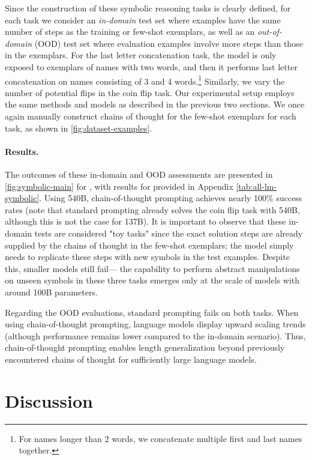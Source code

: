 Since the construction of these symbolic reasoning tasks is clearly defined, for each task we consider an \textit{in-domain} test set where examples have the same number of steps as the training or few-shot exemplars, as well as an \textit{out-of-domain} (OOD) test set where evaluation examples involve more steps than those in the exemplars. For the last letter concatenation task, the model is only exposed to exemplars of names with two words, and then it performs last letter concatenation on names consisting of 3 and 4 words.\footnote{For names longer than 2 words, we concatenate multiple first and last names together.} Similarly, we vary the number of potential flips in the coin flip task. Our experimental setup employs the same methods and models as described in the previous two sections. We once again manually construct chains of thought for the few-shot exemplars for each task, as shown in \cref{fig:dataset-examples}.

\paragraph{Results.}
The outcomes of these in-domain and OOD assessments are presented in \cref{fig:symbolic-main} for \palm{}, with results for \lamda{} provided in Appendix \cref{tab:all-lm-symbolic}. Using \palm{} 540B, chain-of-thought prompting achieves nearly 100\% success rates (note that standard prompting already solves the coin flip task with \palm{} 540B, although this is not the case for \lamda{} 137B). It is important to observe that these in-domain tests are considered "toy tasks" since the exact solution steps are already supplied by the chains of thought in the few-shot exemplars; the model simply needs to replicate these steps with new symbols in the test examples. Despite this, smaller models still fail— the capability to perform abstract manipulations on unseen symbols in these three tasks emerges only at the scale of models with around 100B parameters.

Regarding the OOD evaluations, standard prompting fails on both tasks. When using chain-of-thought prompting, language models display upward scaling trends (although performance remains lower compared to the in-domain scenario). Thus, chain-of-thought prompting enables length generalization beyond previously encountered chains of thought for sufficiently large language models.

\section{Discussion}\label{sec:discussion}

